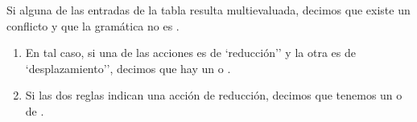 
\begin{definition}
Si alguna de las entradas de la tabla resulta multievaluada, decimos
que existe un conflicto y que la gramática no es .

\begin{enumerate}
\item
En tal caso, si una de las acciones es de `reducción'' y la otra es de
`desplazamiento'', decimos que hay un  o
. 
\item
Si las
dos reglas indican una acción de reducción, decimos que tenemos un 
 o de .
\end{enumerate}
\end{definition}


